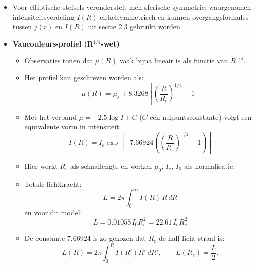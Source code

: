 \documentclass[10pt,a4paper]{article}
\renewenvironment{equation}{\begin{equation*}}{\end{equation*}}
\begin{document}
\begin{itemize}


  \item Voor elliptische stelsels veronderstelt men sferische symmetrie: waargenomen intensiteitsverdeling $I(R)$ cirkelsymmetrisch en kunnen overgangsformules tussen $j(r)$ en $I(R)$ uit sectie 2.3 gebruikt worden.

  \item \textbf{Vaucouleurs-profiel (R$^{1/4}$-wet)}
  \begin{itemize}
    \item Observaties tonen dat $\mu(R)$ vaak bijna lineair is als functie van $R^{1/4}$.
    \item Het profiel kan geschreven worden als:
    \begin{equation}
      \mu(R)=\mu_e+8.3268\left[\left(\frac{R}{R_e}\right)^{1/4}-1\right]
      \tag{2.31}
    \end{equation}
    \item Met het verband $\mu=-2.5\log I + C$ ($C$ een nulpuntsconstante) volgt een equivalente vorm in intensiteit:
    \begin{equation}
      I(R)=I_e\exp\!\left[-7.66924\left(\left(\frac{R}{R_e}\right)^{1/4}-1\right)\right]
      \tag{2.34}
    \end{equation}
    \item Hier werkt $R_e$ als schaallengte en werken $\mu_0$, $I_e$, $I_0$ als normalisatie.
    \item Totale lichtkracht:
    \begin{equation}
      L=2\pi\int_0^\infty I(R)\,R\,dR
      \tag{2.35}
    \end{equation}
    en voor dit model:
    \begin{equation}
      L=0.01058\,I_0R_e^2=22.61\,I_eR_e^2
      \tag{2.36}
    \end{equation}
    \item De constante $7.66924$ is zo gekozen dat $R_e$ de half-licht straal is:
    \begin{equation}
      L(R)=2\pi\int_0^R I(R')R'\,dR',\qquad L(R_e)=\frac{L}{2}.
      \tag{2.37--2.38}
    \end{equation}
  \end{itemize}


\end{itemize}
\end{document}

